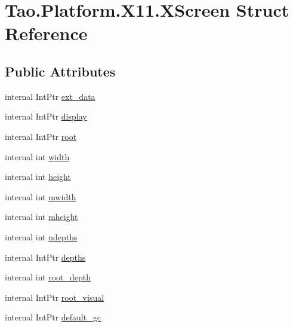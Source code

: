 \hypertarget{struct_tao_1_1_platform_1_1_x11_1_1_x_screen}{
\section{Tao.Platform.X11.XScreen Struct Reference}
\label{struct_tao_1_1_platform_1_1_x11_1_1_x_screen}
}
\subsection*{Public Attributes}
\begin{DoxyCompactItemize}
\item 
internal IntPtr \hyperlink{struct_tao_1_1_platform_1_1_x11_1_1_x_screen_a5609a3577c8ee2418f0fb7292fa30786}{ext\_\-data}
\item 
internal IntPtr \hyperlink{struct_tao_1_1_platform_1_1_x11_1_1_x_screen_a201b95512c325c508e000dd390faddd5}{display}
\item 
internal IntPtr \hyperlink{struct_tao_1_1_platform_1_1_x11_1_1_x_screen_a2b1772246479579cb7a8079ab037dc18}{root}
\item 
internal int \hyperlink{struct_tao_1_1_platform_1_1_x11_1_1_x_screen_a9918259e4d0f885733f12b72b8dc4a12}{width}
\item 
internal int \hyperlink{struct_tao_1_1_platform_1_1_x11_1_1_x_screen_ace7d399976afaf470217292075fa24ca}{height}
\item 
internal int \hyperlink{struct_tao_1_1_platform_1_1_x11_1_1_x_screen_a11dab8e726d6addc638803eac249a14e}{mwidth}
\item 
internal int \hyperlink{struct_tao_1_1_platform_1_1_x11_1_1_x_screen_a8eb57bf991fbc8a39ddec2d3015827de}{mheight}
\item 
internal int \hyperlink{struct_tao_1_1_platform_1_1_x11_1_1_x_screen_a8b1273bf90622bb31cb74b828eab3824}{ndepths}
\item 
internal IntPtr \hyperlink{struct_tao_1_1_platform_1_1_x11_1_1_x_screen_a1f5d4f9b4d96d93a84ffc10a508235eb}{depths}
\item 
internal int \hyperlink{struct_tao_1_1_platform_1_1_x11_1_1_x_screen_af23bafeeb9845c605f18a1ab34d6f18c}{root\_\-depth}
\item 
internal IntPtr \hyperlink{struct_tao_1_1_platform_1_1_x11_1_1_x_screen_abf104f6415f544fd53428d5805a791ae}{root\_\-visual}
\item 
internal IntPtr \hyperlink{struct_tao_1_1_platform_1_1_x11_1_1_x_screen_af9b8ca6e18228e36b0a6300a0b8c01b9}{default\_\-gc}

\end{DoxyCompactItemize}
